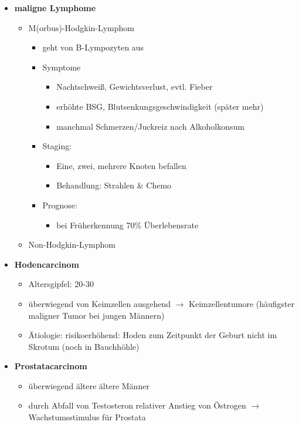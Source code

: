 \begin{itemize}
			\item \textbf{maligne Lymphome}
				\begin{itemize}
					\item M(orbus)-Hodgkin-Lymphom
						\begin{itemize}
							\item geht von B-Lympozyten aus
							\item Symptome
								\begin{itemize}
									\item Nachtschweiß, Gewichtsverlust, evtl. Fieber
									\item erhöhte BSG, Blutsenkungsgeschwindigkeit (später mehr)
									\item manchmal Schmerzen/Juckreiz nach Alkoholkonsum
								\end{itemize}
							\item Staging:
								\begin{itemize}
									\item Eine, zwei, mehrere Knoten befallen
									\item Behandlung: Strahlen \& Chemo
								\end{itemize}
							\item Prognose:
								\begin{itemize}
									\item bei Früherkennung 70\% Überlebensrate
								\end{itemize}
						\end{itemize}
					\item Non-Hodgkin-Lymphom
				\end{itemize}		
			\item \textbf{Hodencarcinom}
				\begin{itemize}
					\item Altersgipfel: 20-30
					\item überwiegend von Keimzellen ausgehend $\rightarrow$ Keimzellentumore (häufigster maligner Tumor bei jungen Männern)
					\item Ätiologie: risikoerhöhend: Hoden zum Zeitpunkt der Geburt nicht im Skrotum (noch in Bauchhöhle)
				\end{itemize}
			\item \textbf{Prostatacarcinom}
				\begin{itemize}
					\item überwiegend ältere ältere Männer
					\item durch Abfall von Testosteron relativer Anstieg von Östrogen $\rightarrow$ Wachstumsstimulus für Prostata

\end{itemize}
\end{itemize}
